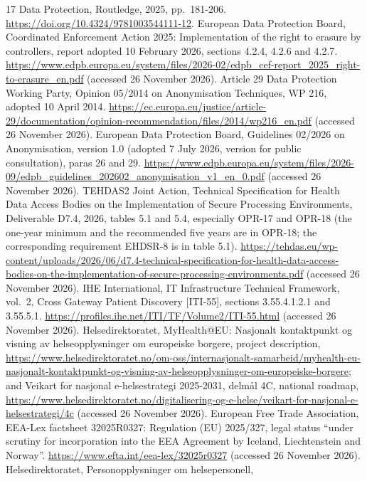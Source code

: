 \documentclass[preprint,review,12pt]{elsarticle}
\begin{document}
\begin{thebibliography}{17}
Data Protection, Routledge, 2025, pp.~181-206.
\url{https://doi.org/10.4324/9781003544111-12}.
 European Data Protection Board, Coordinated Enforcement Action
2025: Implementation of the right to erasure by controllers, report
adopted 10 February 2026, sections 4.2.4, 4.2.6 and 4.2.7.
\url{https://www.edpb.europa.eu/system/files/2026-02/edpb_cef-report_2025_right-to-erasure_en.pdf}
(accessed 26 November 2026).
 Article 29 Data Protection Working Party, Opinion 05/2014 on
Anonymisation Techniques, WP 216, adopted 10 April 2014.
\url{https://ec.europa.eu/justice/article-29/documentation/opinion-recommendation/files/2014/wp216_en.pdf}
(accessed 26 November 2026).
 European Data Protection Board, Guidelines 02/2026 on
Anonymisation, version 1.0 (adopted 7 July 2026, version for public
consultation), paras 26 and 29.
\url{https://www.edpb.europa.eu/system/files/2026-09/edpb_guidelines_202602_anonymisation_v1_en_0.pdf}
(accessed 26 November 2026).
 TEHDAS2 Joint Action, Technical Specification for Health Data
Access Bodies on the Implementation of Secure Processing Environments,
Deliverable D7.4, 2026, tables 5.1 and 5.4, especially OPR-17 and OPR-18
(the one-year minimum and the recommended five years are in OPR-18; the
corresponding requirement EHDSR-8 is in table 5.1).
\url{https://tehdas.eu/wp-content/uploads/2026/06/d7.4-technical-specification-for-health-data-access-bodies-on-the-implementation-of-secure-processing-environments.pdf}
(accessed 26 November 2026).
 IHE International, IT Infrastructure Technical Framework,
vol.~2, Cross Gateway Patient Discovery {[}ITI-55{]}, sections
3.55.4.1.2.1 and 3.55.5.1.
\url{https://profiles.ihe.net/ITI/TF/Volume2/ITI-55.html} (accessed 26
November 2026).
 Helsedirektoratet, MyHealth@EU: Nasjonalt kontaktpunkt og
visning av helseopplysninger om europeiske borgere, project description,
\url{https://www.helsedirektoratet.no/om-oss/internasjonalt-samarbeid/myhealth-eu-nasjonalt-kontaktpunkt-og-visning-av-helseopplysninger-om-europeiske-borgere};
and Veikart for nasjonal e-helsestrategi 2025-2031, delmål 4C, national
roadmap,
\url{https://www.helsedirektoratet.no/digitalisering-og-e-helse/veikart-for-nasjonal-e-helsestrategi/4c}
(accessed 26 November 2026).
 European Free Trade Association, EEA-Lex factsheet 32025R0327:
Regulation (EU) 2025/327, legal status ``under scrutiny for
incorporation into the EEA Agreement by Iceland, Liechtenstein and
Norway''. \url{https://www.efta.int/eea-lex/32025r0327} (accessed 26
November 2026).
 Helsedirektoratet, Personopplysninger om helsepersonell,

\end{thebibliography}
\end{document}
